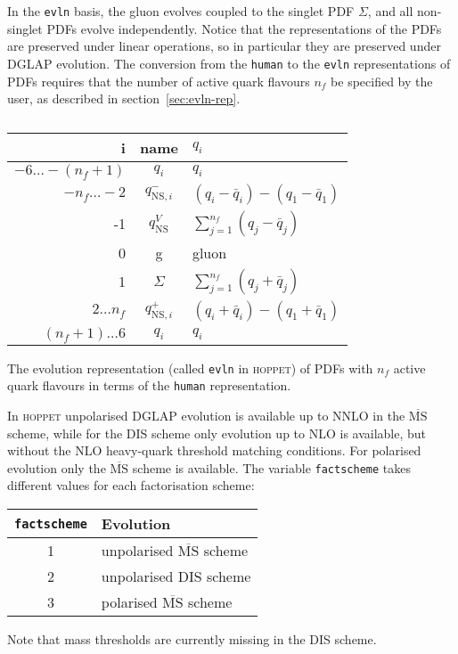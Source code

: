 \documentclass[12pt]{article}
\newcommand{\MSbar}{\overline{\mathrm{MS}}}
\newcommand{\hoppet}{\textsc{hoppet}\xspace}
\newcommand{\ttt}[1]{\texttt{#1}}
\begin{document}
In the {\tt evln} basis, 
the gluon evolves coupled to the singlet  PDF $\Sigma$,
and all non-singlet PDFs evolve independently.
Notice that the representations of the PDFs
are preserved under linear operations, so in particular
they are preserved under DGLAP evolution.
The conversion from the \ttt{human} to the \ttt{evln}
representations of PDFs requires that the number of
active quark flavours $n_f$ be specified by the user, as described in
section~\ref{sec:evln-rep}.

\begin{table}
\begin{center}
\begin{tabular}{|r | c | l |}
\hline
     i & \mbox{name} & $q_i$ \\ \hline
     $ -6\ldots-(n_f+1)$ & $q_i$ & $q_i$\\
     $-n_f\ldots -2$ & $q_{\mathrm{NS},i}^{-}$ & 
$(q_i -  {\bar q}_i) - (q_1 - {\bar q}_1)$\\
      -1           & $q_{\mathrm{NS}}^{V}$ & 
$\sum_{j=1}^{n_f} (q_j -  {\bar q}_j)$\\
       0           & g & \textrm{gluon} \\
       1           & $\Sigma$ & $\sum_{j=1}^{n_f} (q_j +  {\bar q}_j)$\\
     $2\ldots n_f$ & $q_{\mathrm{NS},i}^{+}$ &
$ (q_i +  {\bar q}_i) - (q_1 + {\bar q}_1)$\\
      $(n_f+1)\ldots6$ & $q_i$ & $q_i$ \\
\hline
\end{tabular}
\caption{}{\label{eq:diag_split} The evolution representation 
(called \ttt{evln} in \hoppet)
of PDFs with $n_f$ active quark flavours
in terms of the \ttt{human} representation.}  
\end{center}
\end{table}

In \hoppet unpolarised DGLAP evolution is available up to NNLO
in the $\MSbar$ scheme, while for the DIS scheme
only evolution up to NLO is available, but without the NLO heavy-quark
threshold matching conditions. For polarised evolution only
the $\MSbar$ scheme is available. The variable \ttt{factscheme}
takes different values for each factorisation scheme:
\begin{center}
  \begin{tabular}{|c|l|}\hline
    \ttt{factscheme} & Evolution\\[2pt]\hline
    1 & unpolarised $\MSbar$ scheme\\[2pt]\hline
    2 & unpolarised DIS scheme\\[2pt]\hline
    3 & polarised $\MSbar$ scheme\\\hline
  \end{tabular}
\end{center}
Note that mass thresholds are currently
missing in the DIS scheme.
\end{document}
